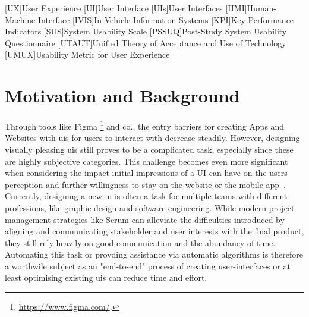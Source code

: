 \documentclass[10pt,a4paper]{scrartcl} %
\begin{document}
\pagestyle{plain}
\title{\rmfamily\normalfont{}}
\subtitle{\rmfamily{}}
\author{}

\maketitle
\begin{acronym}
    [UX]{User Experience}
    [UI]{User Interface}
    [UIs]{User Interfaces}
    [HMI]{Human-Machine Interface}
    [IVIS]{In-Vehicle Information Systems}
    [KPI]{Key Performance Indicators}
    [SUS]{System Usability Scale}
    [PSSUQ]{Post-Study System Usability Questionnaire}
    [UTAUT]{Unified Theory of Acceptance and Use of Technology}
    [UMUX]{Usability Metric for User Experience}
\end{acronym}

\section{Motivation and Background}
Through tools like Figma \footnote{\url{https://www.figma.com/}.}
and co., the entry barriers for creating Apps and Websites with \ac{uis} for users to 
interact with decrease steadily. However, designing visually pleasing \ac{uis}  still 
proves to be a complicated task, especially since these are highly subjective categories. 
This challenge becomes even more significant when considering the impact initial 
impressions of a UI can have on the users perception and further willingness to stay on 
the website or the mobile app~\cite{effects_of_website_designs}. Currently, designing a 
new \ac{ui} is often a task for multiple teams with different professions, 
like graphic design and software engineering. While modern project management strategies
 like Scrum can alleviate the difficulties introduced by aligning and communicating 
 stakeholder and user interests with the final product, they still rely heavily on good
 communication and the abundancy of time. Automating this task or provding assistance 
 via automatic algorithms is therefore a worthwile subject as an "end-to-end" process 
 of creating user-interfaces or at least optimising existing \ac{uis} can reduce time 
and effort. 
\end{document}
